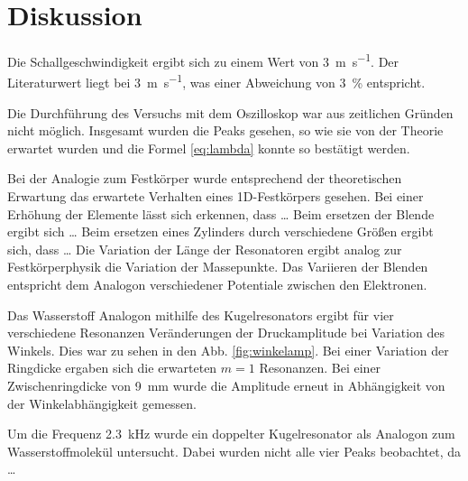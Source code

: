 \section{Diskussion}
\label{sec:Diskussion}

Die Schallgeschwindigkeit ergibt sich zu einem Wert von \SI{3}{\meter\per\second}. Der Literaturwert liegt bei \SI{3}{\meter\per\second}, was einer Abweichung von \SI{3}{\percent} entspricht. 

Die Durchführung des Versuchs mit dem Oszilloskop war aus zeitlichen Gründen nicht möglich. 
Insgesamt wurden die Peaks gesehen, so wie sie von der Theorie erwartet wurden und die Formel \eqref{eq:lambda} konnte so bestätigt werden. 

Bei der Analogie zum Festkörper wurde entsprechend der theoretischen Erwartung das erwartete Verhalten eines 1D-Festkörpers gesehen. Bei einer Erhöhung der Elemente lässt sich erkennen, dass \dots
Beim ersetzen der Blende ergibt sich \dots
Beim ersetzen eines Zylinders durch verschiedene Größen ergibt sich, dass \dots
Die Variation der Länge der Resonatoren ergibt analog zur Festkörperphysik die Variation der Massepunkte.
Das Variieren der Blenden entspricht dem Analogon verschiedener Potentiale zwischen den Elektronen. 

Das Wasserstoff Analogon mithilfe des Kugelresonators ergibt für vier verschiedene Resonanzen Veränderungen der Druckamplitude bei Variation des Winkels. Dies war zu sehen in den Abb. \ref{fig:winkelamp}. 
Bei einer Variation der Ringdicke ergaben sich die erwarteten $m=1$ Resonanzen. 
Bei einer Zwischenringdicke von \SI{9}{\milli\meter} wurde die Amplitude erneut in Abhängigkeit von der Winkelabhängigkeit gemessen. 

Um die Frequenz \SI{2.3}{\kilo\hertz} wurde ein doppelter Kugelresonator als Analogon zum Wasserstoffmolekül untersucht. 
Dabei wurden nicht alle vier Peaks beobachtet, da \dots

